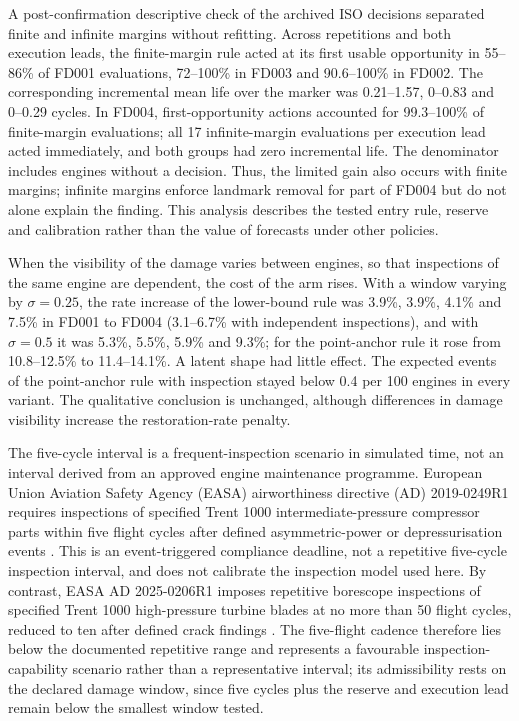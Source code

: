 \documentclass[12pt]{article}
\begin{document}
A post-confirmation descriptive check of the archived ISO decisions separated finite and infinite margins without refitting. Across repetitions and both execution leads, the finite-margin rule acted at its first usable opportunity in 55--86\% of FD001 evaluations, 72--100\% in FD003 and 90.6--100\% in FD002. The corresponding incremental mean life over the marker was 0.21--1.57, 0--0.83 and 0--0.29 cycles. In FD004, first-opportunity actions accounted for 99.3--100\% of finite-margin evaluations; all 17 infinite-margin evaluations per execution lead acted immediately, and both groups had zero incremental life. The denominator includes engines without a decision. Thus, the limited gain also occurs with finite margins; infinite margins enforce landmark removal for part of FD004 but do not alone explain the finding. This analysis describes the tested entry rule, reserve and calibration rather than the value of forecasts under other policies.

When the visibility of the damage varies between engines, so that inspections of the same engine are dependent, the cost of the arm rises. With a window varying by $\sigma=0.25$, the rate increase of the lower-bound rule was 3.9\%, 3.9\%, 4.1\% and 7.5\% in FD001 to FD004 (3.1--6.7\% with independent inspections), and with $\sigma=0.5$ it was 5.3\%, 5.5\%, 5.9\% and 9.3\%; for the point-anchor rule it rose from 10.8--12.5\% to 11.4--14.1\%. A latent shape had little effect. The expected events of the point-anchor rule with inspection stayed below 0.4 per 100 engines in every variant. The qualitative conclusion is unchanged, although differences in damage visibility increase the restoration-rate penalty.

The five-cycle interval is a frequent-inspection scenario in simulated time, not an interval derived from an approved engine maintenance programme. European Union Aviation Safety Agency (EASA) airworthiness directive (AD) 2019-0249R1 requires inspections of specified Trent 1000 intermediate-pressure compressor parts within five flight cycles after defined asymmetric-power or depressurisation events \cite{EASA2019_0249R1}. This is an event-triggered compliance deadline, not a repetitive five-cycle inspection interval, and does not calibrate the inspection model used here. By contrast, EASA AD 2025-0206R1 imposes repetitive borescope inspections of specified Trent 1000 high-pressure turbine blades at no more than 50 flight cycles, reduced to ten after defined crack findings \cite{EASA2025AD0206R1}. The five-flight cadence therefore lies below the documented repetitive range and represents a favourable inspection-capability scenario rather than a representative interval; its admissibility rests on the declared damage window, since five cycles plus the reserve and execution lead remain below the smallest window tested.
\end{document}
